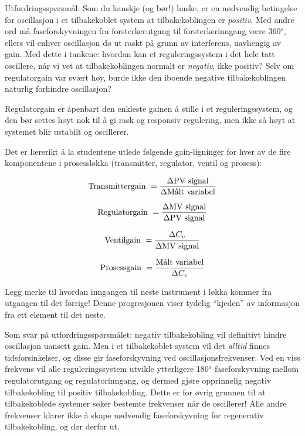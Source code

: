 \vskip 10pt

Utfordringsspørsmål: Som du kanskje (og bør!) huske, er en nødvendig betingelse for oscillasjon i et tilbakekoblet system at tilbakekoblingen er {\it positiv}. Med andre ord må faseforskyvningen fra forsterkerutgang til forsterkerinngang være 360$^{o}$, ellers vil enhver oscillasjon dø ut raskt på grunn av interferens, uavhengig av gain. Med dette i tankene: hvordan kan et reguleringssystem i det hele tatt oscillere, når vi vet at tilbakekoblingen normalt er {\it negativ}, ikke positiv? Selv om regulatorgain var svært høy, burde ikke den iboende negative tilbakekoblingen naturlig forhindre oscillasjon?







Regulatorgain er åpenbart den enkleste gainen å stille i et reguleringssystem, og den bør settes høyt nok til å gi rask og responsiv regulering, men ikke så høyt at systemet blir ustabilt og oscillerer.

\vskip 10pt

Det er lærerikt å la studentene utlede følgende gain-ligninger for hver av de fire komponentene i prosessløkka (transmitter, regulator, ventil og prosess):

$$\hbox{Transmittergain } = {\Delta \hbox{PV signal} \over \Delta \hbox{Målt variabel}}$$

$$\hbox{Regulatorgain } = {\Delta \hbox{MV signal} \over \Delta \hbox{PV signal}}$$

$$\hbox{Ventilgain } = {\Delta C_v \over \Delta \hbox{MV signal}}$$

$$\hbox{Prosessgain } = {\hbox{Målt variabel} \over \Delta C_v}$$

Legg merke til hvordan inngangen til neste instrument i løkka kommer fra utgangen til det forrige! Denne progresjonen viser tydelig ``kjeden'' av informasjon fra ett element til det neste.

\vskip 10pt

Som svar på utfordringsspørsmålet: negativ tilbakekobling vil definitivt hindre oscillasjon uansett gain. Men i et tilbakekoblet system vil det {\it alltid} finnes tidsforsinkelser, og disse gir faseforskyvning ved oscillasjonsfrekvenser. Ved en viss frekvens vil alle reguleringssystem utvikle ytterligere 180$^{o}$ faseforskyvning mellom regulatorutgang og regulatorinngang, og dermed gjøre opprinnelig negativ tilbakekobling til positiv tilbakekobling. Dette er for øvrig grunnen til at tilbakekoblede systemer søker bestemte frekvenser når de oscillerer! Alle andre frekvenser klarer ikke å skape nødvendig faseforskyvning for regenerativ tilbakekobling, og dør derfor ut.



